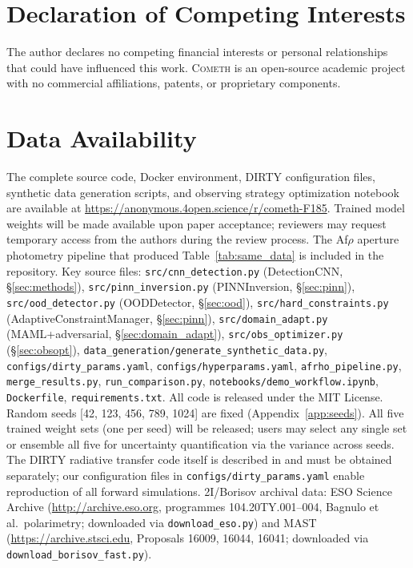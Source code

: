 \documentclass[usenatbib]{mnras}
\begin{document}
\section*{Declaration of Competing Interests}

The author declares no competing financial interests or personal relationships that could have influenced this work. \textsc{Cometh} is an open-source academic project with no commercial affiliations, patents, or proprietary components.

\section*{Data Availability}\label{sec:data_availability}
The complete source code, Docker environment, DIRTY configuration files, synthetic data generation scripts, and observing strategy optimization notebook are available at \url{https://anonymous.4open.science/r/cometh-F185}. Trained model weights will be made available upon paper acceptance; reviewers may request temporary access from the authors during the review process. The Af$\rho$ aperture photometry pipeline that produced Table~\ref{tab:same_data} is included in the repository. Key source files: \texttt{src/cnn\_detection.py} (DetectionCNN, \S\ref{sec:methods}), \texttt{src/pinn\_inversion.py} (PINNInversion, \S\ref{sec:pinn}), \texttt{src/ood\_detector.py} (OODDetector, \S\ref{sec:ood}), \texttt{src/hard\_constraints.py} (AdaptiveConstraintManager, \S\ref{sec:pinn}), \texttt{src/domain\_adapt.py} (MAML+adversarial, \S\ref{sec:domain_adapt}), \texttt{src/obs\_optimizer.py} (\S\ref{sec:obsopt}), \texttt{data\_generation/generate\_synthetic\_data.py}, \texttt{configs/dirty\_params.yaml}, \texttt{configs/hyperparams.yaml}, \texttt{afrho\_pipeline.py}, \texttt{merge\_results.py}, \texttt{run\_comparison.py}, \texttt{notebooks/demo\_workflow.ipynb}, \texttt{Dockerfile}, \texttt{requirements.txt}. All code is released under the MIT License. Random seeds [42, 123, 456, 789, 1024] are fixed (Appendix~\ref{app:seeds}). All five trained weight sets (one per seed) will be released; users may select any single set or ensemble all five for uncertainty quantification via the variance across seeds. The DIRTY radiative transfer code itself is described in \citet{gordon01} and must be obtained separately; our configuration files in {\tt configs/dirty\_params.yaml} enable reproduction of all forward simulations. 2I/Borisov archival data: ESO Science Archive (\url{http://archive.eso.org}, programmes 104.20TY.001--004, Bagnulo et al.\ polarimetry; downloaded via \texttt{download\_eso.py}) and MAST (\url{https://archive.stsci.edu}, Proposals 16009, 16044, 16041; downloaded via \texttt{download\_borisov\_fast.py}).
\end{document}
